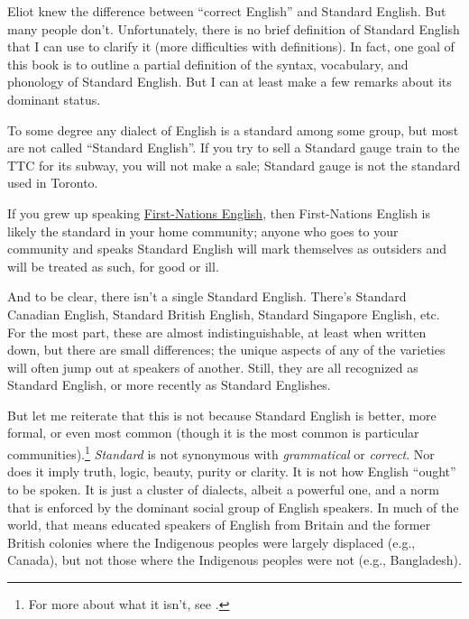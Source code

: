 Eliot knew the difference between ``correct English'' and Standard English. But many people don't. Unfortunately, there is no brief definition of Standard English that I can use to clarify it (more difficulties with definitions). In fact, one goal of this book is to outline a partial definition of the syntax, vocabulary, and phonology of Standard English. But I can at least make a few remarks about its dominant status.

To some degree any dialect of English is a standard among some group, but most are not called ``Standard English''. If you try to sell a Standard gauge train to the TTC for its subway, you will not make a sale; Standard gauge is not the standard used in Toronto.

If you grew up speaking \href{https://en.wikipedia.org/wiki/Indigenous_English_in_Canada}{First-Nations English}, then First-Nations English is likely the standard in your home community; anyone who goes to your community and speaks Standard English will mark themselves as outsiders and will be treated as such, for good or ill.

And to be clear, there isn't a single Standard English. There's Standard Canadian English, Standard British English, Standard Singapore English, etc. For the most part, these are almost indistinguishable, at least when written down, but there are small differences; the unique aspects of any of the varieties will often jump out at speakers of another. Still, they are all recognized as Standard English, or more recently as Standard Englishes.

But let me reiterate that this is not because Standard English is better, more formal, or even most common (though it is the most common is particular communities).\footnote{For more about what it isn't, see \citet{trudgill99}.} \textit{Standard} is not synonymous with \textit{grammatical} or \textit{correct}. Nor does it imply truth, logic, beauty, purity or clarity. It is not how English ``ought'' to be spoken. It is just a cluster of dialects, albeit a powerful one, and a norm that is enforced by the dominant social group of English speakers. In much of the world, that means educated speakers of English from Britain and the former British colonies where the Indigenous peoples were largely displaced (e.g., Canada), but not those where the Indigenous peoples were not (e.g., Bangladesh).


